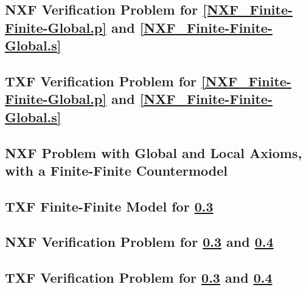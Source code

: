 \documentclass{easychair}
\begin{document}
\newpage
\subsection{NXF Verification Problem for \ref{NXF_Finite-Finite-Global.p} and 
\ref{NXF_Finite-Finite-Global.s}}
\label{NXF_Finite-Finite-Global.s.NXF.p}
\begin{small}

\end{small}

\newpage
\subsection{TXF Verification Problem for \ref{NXF_Finite-Finite-Global.p} and 
\ref{NXF_Finite-Finite-Global.s}}
\label{NXF_Finite-Finite-Global.s.p}
\begin{small}

\end{small}

\newpage
\subsection{NXF Problem with Global and Local Axioms, \\
            with a Finite-Finite Countermodel}
\label{NXF_Finite-Finite-Local.p}
\begin{small}

\end{small}

\newpage
\subsection{TXF Finite-Finite Model for \ref{NXF_Finite-Finite-Local.p}}
\label{NXF_Finite-Finite-Local.s}
\begin{small}

\end{small}

\newpage
\subsection{NXF Verification Problem for \ref{NXF_Finite-Finite-Local.p} and
\ref{NXF_Finite-Finite-Local.s}}
\label{NXF_Finite-Finite-Local.s.NXF.p}
\begin{small}

\end{small}

\newpage
\subsection{TXF Verification Problem for \ref{NXF_Finite-Finite-Local.p} and
\ref{NXF_Finite-Finite-Local.s}}
\label{NXF_Finite-Finite-Local.s.p}
\begin{small}

\end{small}
\end{document}

